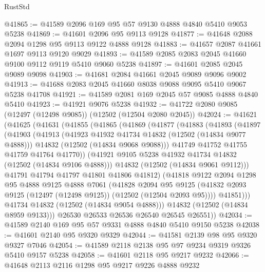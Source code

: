 \begin{lexlean}{RustStd}
\begin{coremodule}
@41865 := @41589 @2096 @169 @95 @57 @9130 @4888 @4840 @5410 @9053 @5238
@41869 := @41601 @2096 @95 @9113 @9128
@41877 := @41648 @2088 @2094 @1298 @95 @9113 @9122 @4888 @9128
@41883 := @41657 @2087 @41661 @1697 @9113 @9120 @9029
@41893 := @41589 @2085 @2083 @2045 @41660 @9100 @9112 @9119 @5410 @9060 @5238
@41897 := @41601 @2085 @2045 @9089 @9098
@41903 := @41681 @2084 @41661 @2045 @9089 @9096 @9002
@41913 := @41688 @2083 @2045 @41660 @8038 @9088 @9095 @5410 @9067 @5238 @41708
@41921 := @41589 @2081 @169 @2045 @57 @9085 @4888 @4840 @5410
@41923 := @41921 @9076 @5238
@41932 := @41722 @2080 @9085 (@12497 (@12498 @9085)) (@12502 (@12504 @2080 @2045))
@42024 := @41621
    (@41625
      (@41631
        (@41855
          (@41865
            (@41869
              (@41877
                (@41883
                  (@41893
                    (@41897
                      (@41903
                        (@41913
                          (@41923 @41932 @41734 @14832 (@12502 (@14834 @9077 @4888)))
                          @14832
                          (@12502 (@14834 @9068 @9088)))
                        @41749
                        @41752
                        @41755
                        @41759
                        @41764
                        @41770))
                    (@41921 @9105 @5238 @41932 @41734 @14832 (@12502 (@14834 @9106 @4888)))
                    @14832
                    (@12502 (@14834 @9061 @9112)))
                  @41791
                  @41794
                  @41797
                  @41801
                  @41806
                  @41812)
                (@41818
                  @9122
                  @2094
                  @1298
                  @95
                  @4888
                  @9125
                  @4888
                  @7061
                  (@41828
                    @2094
                    @95
                    @9125
                    (@41832 @2093 @9125 (@12497 (@12498 @9125)) (@12502 (@12504 @2093 @95))))
                  @41851)))
            @41734
            @14832
            (@12502 (@14834 @9054 @4888)))
          @14832
          (@12502 (@14834 @8959 @9133)))
        @26530
        @26533
        @26536
        @26540
        @26545
        @26551))
@42034 := @41589 @2140 @169 @95 @57 @9331 @4888 @4840 @5410 @9150 @5238
@42038 := @41601 @2140 @95 @9320 @9329
@42044 := @41581 @2139 @98 @95 @9320 @9327 @7046
@42054 := @41589 @2118 @2138 @95 @97 @9234 @9319 @9326 @5410 @9157 @5238
@42058 := @41601 @2118 @95 @9217 @9232
@42066 := @41648 @2113 @2116 @1298 @95 @9217 @9226 @4888 @9232

\end{coremodule}
\end{lexlean}
